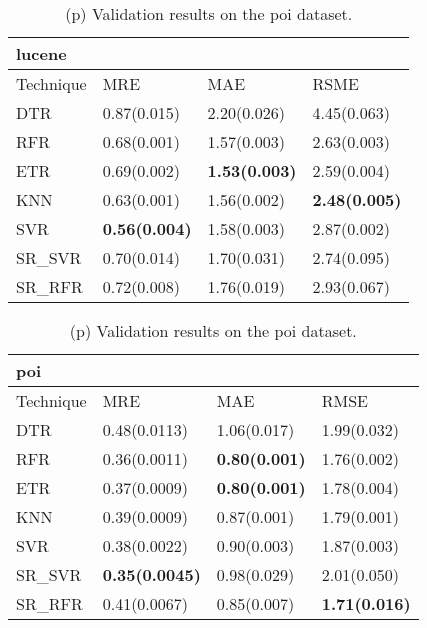 \documentclass[]{article}
\begin{document}
	\begin{table}[h]
		\captionsetup[subtable]{labelformat=empty}
		\begin{adjustwidth}{-3.4cm}{}
			\begin{subtable}{9.5cm}
				\centering
				\caption{(o) Validation results on the lucene dataset.}
				\label{tab:xalan-wv}
				\begin{tabular}{llll}
					\hline
					lucene\\ \hline
					Technique & MRE         & MAE         & RSME        \\ \hline
					DTR       & 0.87(0.015) & 2.20(0.026) & 4.45(0.063) \\
					RFR       & 0.68(0.001) & 1.57(0.003) & 2.63(0.003) \\
					ETR       & 0.69(0.002) & \bfseries 1.53(0.003) & 2.59(0.004) \\
					KNN       & 0.63(0.001) & 1.56(0.002) & \bfseries 2.48(0.005) \\
					SVR       & \bfseries 0.56(0.004) & 1.58(0.003) & 2.87(0.002) \\
					SR\_SVR    & 0.70(0.014) & 1.70(0.031) & 2.74(0.095) \\
					SR\_RFR    & 0.72(0.008) & 1.76(0.019) & 2.93(0.067) \\ \hline
				\end{tabular}
			\end{subtable}
			\begin{subtable}{9.5cm}
				\centering
				\caption{(p) Validation results on the poi dataset.}
				\label{tab:xerces-wv}
				\begin{tabular}{llll}
					\hline
					poi   &              &             &              \\ \hline
					Technique & MRE          & MAE         & RMSE         \\ \hline
					DTR       & 0.48(0.0113) & 1.06(0.017) & 1.99(0.032)  \\
					RFR       & 0.36(0.0011) & \bfseries 0.80(0.001) & 1.76(0.002)  \\
					ETR       & 0.37(0.0009) & \bfseries 0.80(0.001) & 1.78(0.004)  \\
					KNN       & 0.39(0.0009) & 0.87(0.001) & 1.79(0.001)  \\
					SVR       & 0.38(0.0022) & 0.90(0.003) & 1.87(0.003)  \\
					SR\_SVR    & \bfseries 0.35(0.0045) & 0.98(0.029) & 2.01(0.050)  \\
					SR\_RFR    & 0.41(0.0067) & 0.85(0.007) & \bfseries 1.71(0.016)  \\ \hline
				\end{tabular}
			\end{subtable} 
		\end{adjustwidth}
	\end{table}
\end{document}
